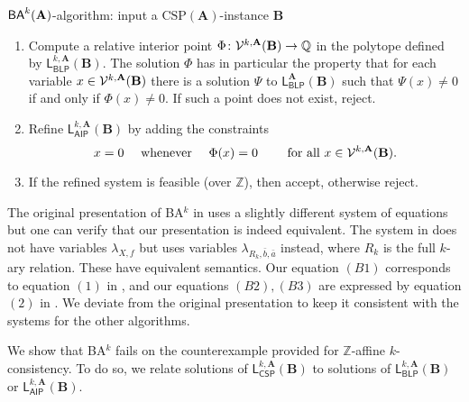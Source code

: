 \documentclass[a4paper,english, thm-restate]{lipics-v2021}
\newcommand{\ZZ}{\mathbb{Z}}
\newcommand{\QQ}{\mathbb{Q}}
\newcommand{\tup}[1]{\bar{#1}}
\newcommand{\StructA}{\mathbf{A}}
\newcommand{\StructB}{\mathbf{B}}
\newcommand{\CSP}[1]{\mathrm{CSP}(#1)}
\newcommand{\leqs}{\mathsf{L}}
\newcommand{\cspiso}[3]{\leqs^{#1,#2}_{\mathsf{CSP}}(#3)}
\newcommand{\blk}[3]{\leqs^{#1,#2}_{\mathsf{BLP}} (#3)}
\newcommand{\aipk}[3]{\leqs^{#1,#2}_{\mathsf{AIP}} (#3)}
\newcommand{\blp}[2]{\leqs^#1_{\mathsf{BLP}} (#2)}
\begin{document}
	\begin{algobox}{$\BAk{k}{\StructA}$-algorithm: input a $\CSP{\StructA}$-instance $\StructB$}
		\begin{enumerate}
			\item Compute a relative interior point $\Phi \colon \VarsIP{k}{\StructA}{\StructB} \to \QQ $ in the polytope defined by $\blk{k}{\StructA}{\StructB}$.
			The solution $\Phi$ has in particular the property that for each variable $x \in \VarsIP{k}{\StructA}{\StructB}$ there is a solution $\Psi$ to $\blp{\StructA}{\StructB}$ such that $\Psi(x) \neq 0$
			if and only if $\Phi(x) \neq 0$.
			If such a point does not exist, reject.\label{itm:bak-interior-point}
			\item \label{item:bak-refined-constr} Refine $\aipk{k}{\StructA}{\StructB}$ by adding the constraints
			\[x = 0 \quad \text { whenever } \quad \Phi(x) = 0 \qquad \text{ for all }{x\in \VarsIP{k}{\StructA}{\StructB}}.\] 
			\item If the refined system is feasible (over $\ZZ$), then accept, otherwise reject.
		\end{enumerate}	
	\end{algobox}
	\noindent The original presentation of BA$^k$ in \cite{CiardoZivny2023Tensors} uses a slightly different system of equations but
	 one can verify that our presentation is indeed equivalent. The system in \cite{CiardoZivny2023Tensors} does not have variables $\lambda_{X,f}$ but uses variables $\lambda_{R_k,\tup{b},\tup{a}}$ instead, where $R_k$ is the full $k$-ary relation. These have equivalent semantics. Our equation $(B1)$ corresponds to equation $(1)$ in \cite{CiardoZivny2023Tensors}, and our equations $(B2), (B3)$ are expressed by equation $(2)$ in \cite{CiardoZivny2023Tensors}. We deviate from the original presentation to keep it consistent with the systems for the other algorithms.
	
	
	
	We show that BA$^k$ fails on the counterexample provided for $\ZZ$-affine $k$-consistency.
	To do so, we relate solutions of $\cspiso{k}{\StructA}{\StructB}$ 
	to solutions of $\blk{k}{\StructA}{\StructB}$ or $\aipk{k}{\StructA}{\StructB}$.
	
\end{document}
